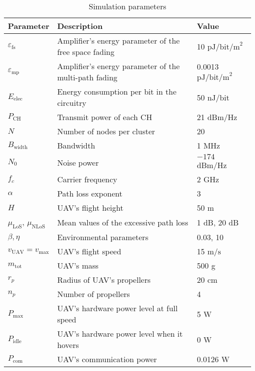 \documentclass[journal]{IEEEtran}
\begin{document}
\begin{table}[t!]
	\centering
	\caption{Simulation parameters}
	\label{table1}
	\scriptsize
	 \begin{tabular}{p{1.5cm}<{\centering}|p{3.9cm}<{\centering}|p{2.3cm}<{\centering}}
		\hline{}
		\textbf{Parameter} & \textbf{Description} & \textbf{Value}\\
		\hline
		$\varepsilon_\text{fs}$ & Amplifier’s  energy  parameter of the free space fading & 10 $\text{pJ/bit/m}^2$ \cite{W. R. Heinzelman}\\
		\hline
		$\varepsilon_\text{mp}$ & Amplifier’s  energy  parameter of the multi-path fading & 0.0013 $\text{pJ/bit/m}^2$ \cite{W. R. Heinzelman}\\
		\hline
		$E_{\text{elec}}$ & Energy consumption per bit in the circuitry & 50 $\text{nJ/bit}$ \cite{W. R. Heinzelman}\\
		\hline
		$P_{\text{CH}}$ & Transmit power of each CH & 21 $\text{dBm/Hz}$ \cite{M. B. Ghorbel}\\
		\hline
        $N$ & Number of nodes per cluster & 20\\
        \hline
        $B_{\text{width}}$ & Bandwidth & 1 MHz \\
        \hline
        $N_0$ & Noise power & $-174$ dBm/Hz \cite{M. B. Ghorbel}\\
        \hline
        $f_c$ & Carrier frequency & 2 GHz \cite{M. B. Ghorbel}\\
        \hline
        $\alpha$ & Path loss exponent & 3 \cite{M. B. Ghorbel}\\
        \hline
        $H$ & UAV's flight height & 50 m \\
        \hline
        $\mu_{\text{LoS}}$, $\mu_{\text{NLoS}}$ & Mean values of the excessive path loss & 1 $\text{dB}$, 20 $\text{dB}$ \cite{A. Al-Hourani}\\
        \hline
        $\beta, \eta$ & Environmental parameters &  0.03, 10 \cite{M. B. Ghorbel}\\
        \hline
        $v_{\text{UAV}} = v_{\text{max}}$ & UAV's flight speed & 15 $\text{m/s}$ \cite{M. B. Ghorbel}\\
        \hline
        $m_{\text{tot}}$ & UAV's mass & 500 g \cite{H. Ghazzai}\\
        \hline
        $r_p$ & Radius of UAV's propellers & 20 cm \cite{H. Ghazzai}\\
        \hline
        $n_p$ & Number of propellers & 4 \cite{H. Ghazzai}\\
        \hline
        $P_{\text{max}}$ &  UAV's hardware power level at full speed & 5 W \cite{H. Ghazzai}\\
        \hline
        $P_{\text{idle}}$ & UAV's hardware power level when it hovers & 0 W \cite{H. Ghazzai}\\
        \hline
        $P_{\text{com}}$ & UAV's communication power & 0.0126 W \cite{M. B. Ghorbel}\\
        \hline
		\end{tabular}
\end{table}
\end{document}
